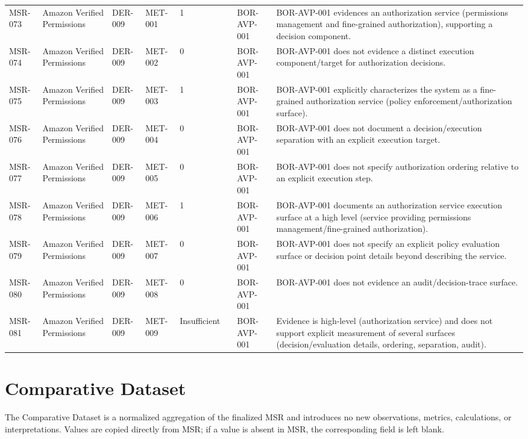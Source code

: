 \documentclass{article}
\begin{document}
\begin{longtable}{@{}p{}p{}p{}p{}p{}p{}p{}p{}@{}}
MSR-073 & Amazon Verified Permissions & DER-009 & MET-001 & 1 &  & BOR-AVP-001 & BOR-AVP-001 evidences an authorization service (permissions management and fine-grained authorization), supporting a decision component.\\
MSR-074 & Amazon Verified Permissions & DER-009 & MET-002 & 0 &  & BOR-AVP-001 & BOR-AVP-001 does not evidence a distinct execution component/target for authorization decisions.\\
MSR-075 & Amazon Verified Permissions & DER-009 & MET-003 & 1 &  & BOR-AVP-001 & BOR-AVP-001 explicitly characterizes the system as a fine-grained authorization service (policy enforcement/authorization surface).\\
MSR-076 & Amazon Verified Permissions & DER-009 & MET-004 & 0 &  & BOR-AVP-001 & BOR-AVP-001 does not document a decision/execution separation with an explicit execution target.\\
MSR-077 & Amazon Verified Permissions & DER-009 & MET-005 & 0 &  & BOR-AVP-001 & BOR-AVP-001 does not specify authorization ordering relative to an explicit execution step.\\
MSR-078 & Amazon Verified Permissions & DER-009 & MET-006 & 1 &  & BOR-AVP-001 & BOR-AVP-001 documents an authorization service execution surface at a high level (service providing permissions management/fine-grained authorization).\\
MSR-079 & Amazon Verified Permissions & DER-009 & MET-007 & 0 &  & BOR-AVP-001 & BOR-AVP-001 does not specify an explicit policy evaluation surface or decision point details beyond describing the service.\\
MSR-080 & Amazon Verified Permissions & DER-009 & MET-008 & 0 &  & BOR-AVP-001 & BOR-AVP-001 does not evidence an audit/decision-trace surface.\\
MSR-081 & Amazon Verified Permissions & DER-009 & MET-009 & Insufficient &  & BOR-AVP-001 & Evidence is high-level (authorization service) and does not support explicit measurement of several surfaces (decision/evaluation details, ordering, separation, audit).\\
\bottomrule
\end{longtable}

\section*{Comparative Dataset}

The Comparative Dataset is a normalized aggregation of the finalized MSR and introduces no new observations, metrics, calculations, or interpretations. Values are copied directly from MSR; if a value is absent in MSR, the corresponding field is left blank.
\end{document}

